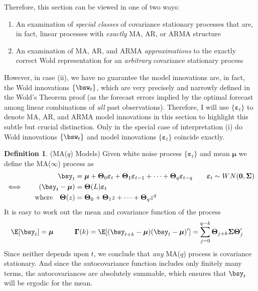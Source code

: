 \documentclass[12pt]{article}
\theoremstyle{plain}
\theoremstyle{definition}
\newtheorem{defn}[thm]{Definition}
\theoremstyle{remark}
\newcommand{\bsTheta}{\boldsymbol{\Theta}}
\newcommand{\bsmu}{\boldsymbol{\mu}}
\newcommand{\bsSigma}{\boldsymbol{\Sigma}}
\newcommand{\bsvarepsilon}{\boldsymbol{\varepsilon}}
\newcommand{\bsGamma}{\boldsymbol{\Gamma}}
\renewcommand{\bso}{\boldsymbol{0}}
\begin{document}
Therefore, this section can be viewed in one of two ways:
\begin{enumerate}[label=(\roman*)]
  \item An examination of \emph{special classes} of covariance
    stationary processes that are, in fact, linear processes with
    \emph{exactly} MA, AR, or ARMA structure
  \item An examination of MA, AR, and ARMA \emph{approximations} to the
    exactly correct Wold representation for an \emph{arbitrary}
    covariance stationary process
\end{enumerate}
However, in case (ii), we have no guarantee the model innovations
are, in fact, the Wold innovations $\{\bsw_t\}$, which are very
precisely and narrowly defined in the Wold's Theorem proof (as the
forecast errors implied by the optimal forecast among linear
combinations of \emph{all} past observations).  Therefore, I will use
$\{\bsvarepsilon_t\}$ to denote MA, AR, and ARMA model innovations in
this section to highlight this subtle but crucial distinction.
Only in the special case of interpretation (i) do Wold innovations
$\{\bsw_t\}$ and model innovations $\{\bsvarepsilon_t\}$ coincide
exactly.

\clearpage
\begin{defn}(MA($q$) Models)
Given white noise process $\{\bsvarepsilon_t\}$ and mean $\bsmu$ we
define the MA($\infty$) process as
\begin{align*}
  \bsy_t &=
  \bsmu
  + \bsTheta_0\bsvarepsilon_t
  + \bsTheta_1\bsvarepsilon_{t-1}
  + \cdots
  + \bsTheta_q\bsvarepsilon_{t-q}
  \qquad \bsvarepsilon_t \sim WN(\bso,\bsSigma)
  \\
  \iff\qquad
  (\bsy_t - \bsmu) &= \bsTheta(L)\bsvarepsilon_t
  \\
  \text{where}\quad
  \bsTheta(z)
  &= \bsTheta_0 + \bsTheta_1z + \cdots + \bsTheta_qz^q
\end{align*}
It is easy to work out the mean and covariance function of the process
\begin{align*}
  \E[\bsy_t]
  =\bsmu
  \qquad
  \quad
  \bsGamma(k)
  =
  \E[(\bsy_{t+k}-\bsmu)(\bsy_t-\bsmu)']
  &= \sum_{j=0}^{q-k} \bsTheta_{j+k}\bsSigma\bsTheta_j'
\end{align*}
Since neither depends upon $t$, we conclude that \emph{any} MA($q$)
process is covariance stationary. And since the autocovariance function
includes only finitely many terms, the autocovariances are absolutely
summable, which ensures that $\bsy_t$ will be ergodic for the mean.
\end{defn}
\end{document}

